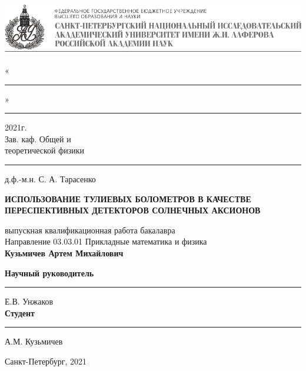 
\begin{titlepage}


\vspace{15mm}
\begin{center}
    \includegraphics[width = \textwidth]{images/autitle.png}
\end{center}

\vspace{0.1mm}

\begin{flushright}
    «\rule{1cm}{0.15mm}» \rule{2cm}{0.15mm} 2021г. \\
    Зав. каф. Общей и \\
    теоретической физики \\
    \rule{25mm}{0.20mm} д.ф.-м.н. С. А. Тарасенко \\
\end{flushright}


\begin{center}

\vspace{9mm}
\textbf{\large ИСПОЛЬЗОВАНИЕ ТУЛИЕВЫХ БОЛОМЕТРОВ В КАЧЕСТВЕ ПЕРЕСПЕКТИВНЫХ ДЕТЕКТОРОВ СОЛНЕЧНЫХ АКСИОНОВ}
\vspace{9mm}

выпускная квалификационная работа бакалавра \\
\vspace{10mm}
Направление 03.03.01 Прикладные математика и физика \\
\vspace{14mm}
\textbf{\large Кузьмичев Артем Михайлович}


\vspace{16mm}

\textbf{Научный руководитель} \hfill \rule{6.5cm}{0.15mm} Е.В. Унжаков \\
\vspace{5mm}
\textbf{Студент} \hfill  \rule{6cm}{0.15mm} А.М. Кузьмичев

\vfill 

{Санкт-Петербург, 2021}
\end{center}
\end{titlepage}
\restoregeometry
\addtocounter{page}{1}